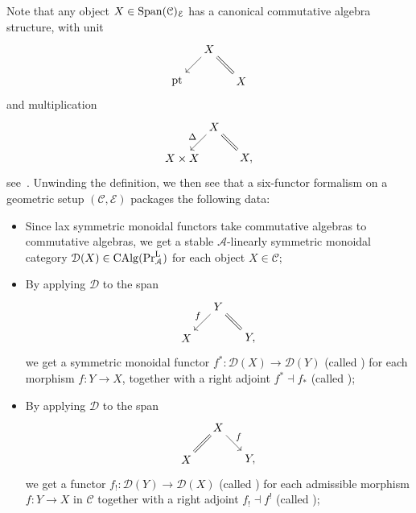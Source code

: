 Note that any object $X\in\operatorname{\mathrm{Span}}({\mathcal C})_{\mathcal E}$ has a canonical commutative algebra structure, with unit
\[
  \begin{tikzpicture}[baseline=(current bounding box.center)]
    \node (X) at (-1,0){$\pt$};
    \node (Z) at (0,1){$X$};
    \node (Xprime) at (1,0){$X$};

    \draw (Z) edge[->] (X);
    \draw (Z) edge[double equal sign distance] (Xprime);
  \end{tikzpicture}
\]
and multiplication
\[
  \begin{tikzpicture}[baseline=(current bounding box.center)]
    \node (X) at (-1,0){$X\times X$};
    \node (Z) at (0,1){$X$};
    \node (Xprime) at (1,0){$X,$};

    \draw (Z) edge[->] node[very near start,left=3.5pt]{{\footnotesize $\Delta$}} (X);
    \draw (Z) edge[double equal sign distance] (Xprime);
  \end{tikzpicture}
\]
see~\cite[Remark 3.13]{Scholze2025}. Unwinding the definition, we then see that a six-functor formalism on a geometric setup $(\mathcal C,\mathcal E)$ packages the following data:
\begin{itemize}
\item Since lax symmetric monoidal functors take commutative algebras to commutative algebras, we get a stable $\mathcal A$-linearly symmetric monoidal category $\mathcal D(X)\in\operatorname{CAlg} (\mathrm{Pr}^{\mathrm{L}}_{\mathcal{A}})$ for each object $X\in\mathcal C$;
\item By applying $\mathcal D$ to the span
  \[
    \begin{tikzpicture}[baseline=(current bounding box.center)]
      \node (X) at (-1,0){$X$};
      \node (Z) at (0,1){$Y$};
      \node (Xprime) at (1,0){$Y,$};

      \draw (Z) edge[->] node[very near start,left=3.5pt]{{\footnotesize $f$}}(X);
      \draw (Z) edge[double equal sign distance] (Xprime);
    \end{tikzpicture}
  \]
  we get a symmetric monoidal functor $f^*\colon \mathcal D(X)\to\mathcal D(Y)$ (called ) for each morphism $f\colon Y\to X$, together with a right adjoint $f^*\dashv f_*$ (called );
\item By applying $\mathcal D$ to the span
  \[
    \begin{tikzpicture}[baseline=(current bounding box.center)]
      \node (X) at (-1,0){$X$};
      \node (Z) at (0,1){$X$};
      \node (Xprime) at (1,0){$Y,$};

      \draw (Z) edge[->] node[very near start,right=3.5pt]{{\footnotesize $f$}}(Xprime);
      \draw (Z) edge[double equal sign distance] (X);
    \end{tikzpicture}
  \]
  we get a functor $f_!\colon\mathcal D(Y)\to\mathcal D(X)$ (called ) for each admissible morphism $f\colon Y\to X$ in $\mathcal C$ together with a right adjoint $f_!\dashv f^!$ (called );
\end{itemize}
